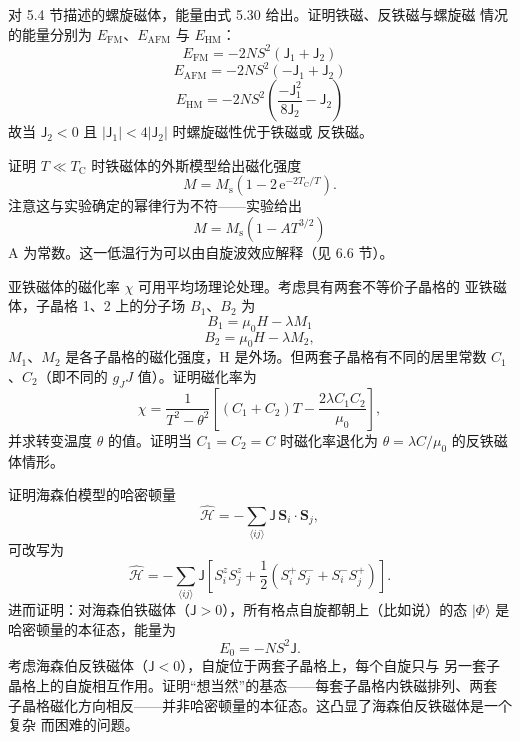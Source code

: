  对 5.4 节描述的螺旋磁体，能量由式 5.30 给出。证明铁磁、反铁磁与螺旋磁
情况的能量分别为 $E_{\mathrm{FM}}$、$E_{\mathrm{AFM}}$ 与 $E_{\mathrm{HM}}$：
\begin{equation*}
E_{\mathrm{FM}} = -2NS^{2}(\mathsf{J}_1+\mathsf{J}_2)\tag{5.43}
\end{equation*}
\begin{equation*}
E_{\mathrm{AFM}} = -2NS^{2}(-\mathsf{J}_1+\mathsf{J}_2)\tag{5.44}
\end{equation*}
\begin{equation*}
E_{\mathrm{HM}} = -2NS^{2}\left(\frac{-\mathsf{J}_1^{2}}{8\mathsf{J}_2} - \mathsf{J}_2\right)\tag{5.45}
\end{equation*}
故当 $\mathsf{J}_2<0$ 且 $|\mathsf{J}_1|<4|\mathsf{J}_2|$ 时螺旋磁性优于铁磁或
反铁磁。

 证明 $T\ll T_{\mathrm{C}}$ 时铁磁体的外斯模型给出磁化强度
\begin{equation*}
M = M_{\mathrm{s}}(1-2\,\mathrm{e}^{-2T_{\mathrm{C}}/T}).\tag{5.46}
\end{equation*}
注意这与实验确定的幂律行为不符——实验给出
\begin{equation*}
M = M_{\mathrm{s}}(1-AT^{3/2})\tag{5.47}
\end{equation*}
A 为常数。这一低温行为可以由自旋波效应解释（见 6.6 节）。

 亚铁磁体的磁化率 $\chi$ 可用平均场理论处理。考虑具有两套不等价子晶格的
亚铁磁体，子晶格 1、2 上的分子场 $B_1$、$B_2$ 为
\begin{equation*}
B_1 = \mu_0H - \lambda M_1\tag{5.48}
\end{equation*}
\begin{equation*}
B_2 = \mu_0H - \lambda M_2,\tag{5.49}
\end{equation*}
$M_1$、$M_2$ 是各子晶格的磁化强度，H 是外场。但两套子晶格有不同的居里常数
$C_1$、$C_2$（即不同的 $g_JJ$ 值）。证明磁化率为
\begin{equation*}
\chi = \frac{1}{T^{2}-\theta^{2}}\left[(C_1+C_2)T - \frac{2\lambda C_1C_2}{\mu_0}\right],\tag{5.50}
\end{equation*}
并求转变温度 $\theta$ 的值。证明当 $C_1=C_2=C$ 时磁化率退化为 $\theta=\lambda C/\mu_0$
的反铁磁体情形。

 证明海森伯模型的哈密顿量
\begin{equation*}
\hat{\mathcal{H}} = -\sum_{\langle ij\rangle}\mathsf{J}\,\mathbf{S}_i\cdot\mathbf{S}_j,\tag{5.51}
\end{equation*}
可改写为
\begin{equation*}
\hat{\mathcal{H}} = -\sum_{\langle ij\rangle}\mathsf{J}\left[S_i^{z}S_j^{z} + \frac{1}{2}(S_i^{+}S_j^{-}+S_i^{-}S_j^{+})\right].\tag{5.52}
\end{equation*}
进而证明：对海森伯铁磁体（$\mathsf{J}>0$），所有格点自旋都朝上（比如说）的态
$|\Phi\rangle$ 是哈密顿量的本征态，能量为
\begin{equation*}
E_0 = -NS^{2}\mathsf{J}.\tag{5.53}
\end{equation*}
考虑海森伯反铁磁体（$\mathsf{J}<0$），自旋位于两套子晶格上，每个自旋只与
另一套子晶格上的自旋相互作用。证明“想当然”的基态——每套子晶格内铁磁排列、两套
子晶格磁化方向相反——并非哈密顿量的本征态。这凸显了海森伯反铁磁体是一个复杂
而困难的问题。

